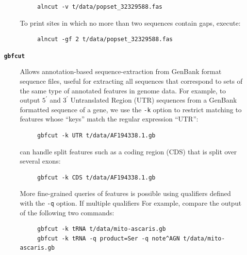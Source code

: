 \documentclass{frontiersSCNS} %
\newcommand{\tp}{$3^\prime${ }}
\newcommand{\fp}{$5^\prime${ }}
\begin{document}
\begin{description}
\begin{verbatim}
     alncut -v t/data/popset_32329588.fas
\end{verbatim}

\noindent To print sites in which no more than two sequences contain
gaps, execute: 

\begin{verbatim}
     alncut -gf 2 t/data/popset_32329588.fas
\end{verbatim}

\item[\texttt{\textbf{ gbfcut}} ] Allows annotation-based
  sequence-extraction from GenBank format sequence files, useful for
  extracting all sequences that correspond to sets of the same type of
  annotated features in genome data. For example, to output \fp and
  \tp Untranslated Region (UTR) sequences from a GenBank formatted
  sequence of a gene, we use the \verb|-k| option to restrict matching
  to features whose ``keys'' match the regular expression ``UTR'':

\begin{verbatim}
     gbfcut -k UTR t/data/AF194338.1.gb
\end{verbatim}

 can handle split features such as a coding region (CDS)
that is split over several exons:

\begin{verbatim}
     gbfcut -k CDS t/data/AF194338.1.gb
\end{verbatim}

\noindent More fine-grained queries of features is possible using
qualifiers defined with the \verb|-q| option. If multiple qualifiers
For example, compare the output of the following two commands:

\begin{verbatim}
     gbfcut -k tRNA t/data/mito-ascaris.gb
     gbfcut -k tRNA -q product=Ser -q note^AGN t/data/mito-ascaris.gb
\end{verbatim}


\end{description}
\end{document}

